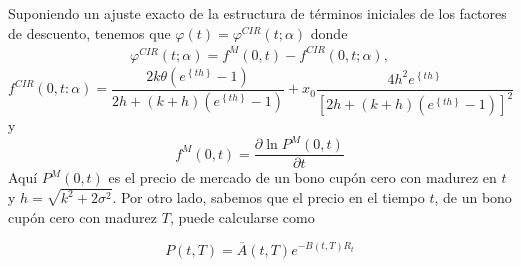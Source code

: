 \documentclass[11pt,notitlepage]{article}
\begin{document}
            Suponiendo un ajuste exacto de la estructura de términos iniciales de los factores de descuento, tenemos que \( \varphi(t)= \varphi^{CIR}(t;\alpha)\) donde 
                \begin{align*}
                    \varphi^{CIR}(t;\alpha)=f^{M}(0,t)-f^{CIR}(0,t;\alpha),
        \end{align*}
        \begin{equation*}
             f^{CIR}(0,t:\alpha)=\frac{2k\theta\left ( e^{\left\{th \right \}}-1 \right )}{2h+(k+h)\left ( e^{\left\{th \right \}}-1 \right )}+x_{0}\frac{4h^2 e^{ \left\{th \right \}}} {\left [ 2h+(k+h)(e^{ \left\{th \right \}}-1 ) \right ]^{2}}
        \end{equation*}
       y
       \begin{equation*}
            f^{M}(0,t)=\frac{\partial \ln P^{M}(0,t)}{\partial t}
       \end{equation*}
       Aquí \(P^{M}(0,t)\) es el precio de mercado de un bono cupón cero con madurez en \(t\) y  \(h=\sqrt{k^{2}+2\sigma^{2}}\). Por otro lado, sabemos que el precio en el tiempo \(t\), de un bono cupón cero con madurez \(T\), puede calcularse como 
       
        \begin{equation*}
        P(t,T)=\overline{A}(t,T)e^{-B(t,T)R_{t}}
         \end{equation*}
        
\end{document}
